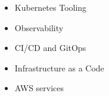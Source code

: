 \begin{itemize}
    \item Kubernetes Tooling
\end{itemize}


\divider

\begin{itemize}
    \item Observability
\end{itemize}


\divider

\begin{itemize}
    \item CI/CD and GitOps
\end{itemize}


\divider

\begin{itemize}
    \item Infrastructure as a Code
\end{itemize}


\divider

\begin{itemize}
    \item AWS services
\end{itemize}


\divider


\bigskip
\bigskip
\bigskip
\bigskip
\bigskip
\bigskip


\clearpage
